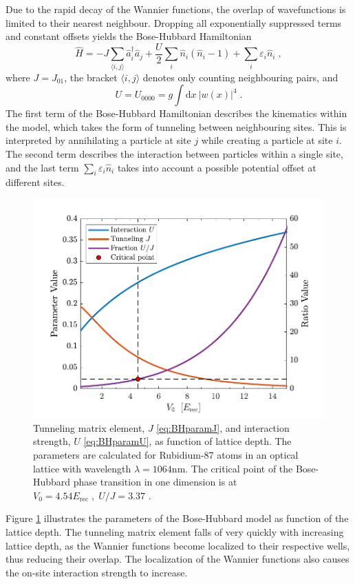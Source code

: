 Due to the rapid decay of the Wannier functions, the overlap of wavefunctions is limited to their nearest neighbour. Dropping all exponentially suppressed terms and constant offsets yields the Bose-Hubbard Hamiltonian
\begin{equation}
	\hat{H} = - J \sum_{\langle i,j \rangle} \hat{a}_{i}^{\dag} \hat{a}_{j} + \frac{U}{2} \sum_{i} \hat{n}_i \left( \hat{n}_i -1 \right) + \sum_{i} \varepsilon_i \hat{n}_i \; ,
	\label{BHhamil}
\end{equation}
where $J = J_{0 1}$, the bracket $\langle i,j \rangle$ denotes only counting neighbouring pairs, and
\begin{equation}
	U = U_{0 0 0 0} = g \int \mathrm{d}x \ |w(x)|^4 \; .
	\label{eq:BHparamU}
\end{equation}
The first term of the Bose-Hubbard Hamiltonian describes the kinematics within the model, which takes the form of tunneling between neighbouring sites. This is interpreted by annihilating a particle at site $j$ while creating a particle at site $i$. The second term describes the interaction between particles within a single site, and the last term $\sum_{i} \varepsilon_i \hat{n}_i$ takes into account a possible potential offset at different sites.
\begin{figure}[!h]
	\centering
	\includegraphics[width=0.8\columnwidth]{Figures/UJparameters.pdf} 
	\caption{Tunneling matrix element, $J$ \eqref{eq:BHparamJ}, and interaction strength, $U$ \eqref{eq:BHparamU}, as function of lattice depth. The parameters are calculated for Rubidium-87 atoms in an optical lattice with wavelength $\lambda = 1064 \mathrm{nm}$. The critical point of the Bose-Hubbard phase transition in one dimension is at $V_0 = 4.54 E_{\mathrm{rec}} \; , \; U/J = 3.37$ \cite{Kuhner2000}.}
	\label{fig:UJparameters} 
\end{figure}
Figure \ref{fig:UJparameters} illustrates the parameters of the Bose-Hubbard model as function of the lattice depth. The tunneling matrix element falls of very quickly with increasing lattice depth, as the Wannier functions become localized to their respective wells, thus reducing their overlap. The localization of the Wannier functions also causes the on-site interaction strength to increase.

